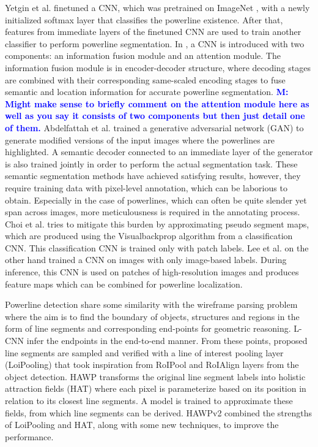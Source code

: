 \documentclass[journal]{IEEEtran}
\newcommand{\commentM}[1]{\textbf{\textcolor{blue}{M: #1}}}
\begin{document}
Yetgin et al. \cite{related_work_omer_emre_yetgin_2018} finetuned a CNN, which was pretrained on ImageNet \cite{deng2009imagenet}, with a newly initialized softmax layer that classifies the powerline existence. After that, features from immediate layers of the finetuned CNN are used to train another classifier to perform powerline segmentation. In \cite{related_work_yan_li_2019}, a CNN is introduced with two components: an information fusion module and an attention module. The information fusion module is in encoder-decoder structure, where decoding stages are combined with their corresponding same-scaled encoding stages to fuse semantic and location information for accurate powerline segmentation. \commentM{Might make sense to briefly comment on the attention module here as well as you say it consists of two components but then just detail one of them.} Abdelfattah et al. \cite{related_work_rabab_abdelfattah_2022} trained a generative adversarial network (GAN) to generate modified versions of the input images where the powerlines are highlighted. A semantic decoder connected to an immediate layer of the generator is also trained jointly in order to perform the actual segmentation task. These semantic segmentation methods have achieved satisfying results, however, they require training data with pixel-level annotation, which can be laborious to obtain. Especially in the case of powerlines, which can often be quite slender yet span across images, more meticulousness is required in the annotating process. Choi et al. \cite{related_work_hyeyeon_choi_2021} tries to mitigate this burden by approximating pseudo segment maps, which are produced using the Visualbackprop algorithm \cite{vbp} from a classification CNN. This classification CNN is trained only with patch labels. Lee et al. \cite{related_work_sang_jun_lee_2017} on the other hand trained a CNN on images with only image-based labels. During inference, this CNN is used on patches of high-resolution images and produces feature maps which can be combined for powerline localization. 

Powerline detection share some similarity with the wireframe parsing problem where the aim is to find the boundary of objects, structures and regions in the form of line segments and corresponding end-points for geometric reasoning. L-CNN \cite{lcnn} infer the endpoints in the end-to-end manner. From these points, proposed line segments are sampled and verified with a line of interest pooling layer (LoiPooling) that took inspiration from RoIPool \cite{fastrcnn} and RoIAlign \cite{maskrcnn} layers from the object detection. HAWP \cite{hawp} transforms the original line segment labels into holistic attraction fields (HAT) where each pixel is parameterize based on its position in relation to its closest line segments. A model is trained to approximate these fields, from which line segments can be derived. HAWPv2 \cite{hawpv2} combined the strengths of LoiPooling and HAT, along with some new techniques, to improve the performance. 
\end{document}
